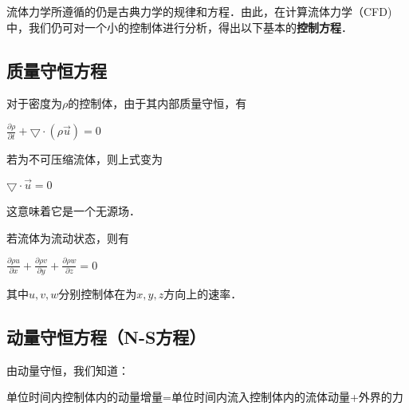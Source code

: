 
\begin{issues}
\issueDraft
\end{issues}


流体力学所遵循的仍是古典力学的规律和方程．由此，在计算流体力学（CFD)中，我们仍可对一个小的控制体进行分析，得出以下基本的\textbf{控制方程}．

\subsection{质量守恒方程}
对于密度为$\rho$的控制体，由于其内部质量守恒，有

$\frac{\partial \rho }{\partial t}+\bigtriangledown \cdot (\rho \overrightarrow{u})=0$

若为不可压缩流体，则上式变为

$\bigtriangledown \cdot \overrightarrow{u} =0$

这意味着它是一个无源场．

若流体为流动状态，则有

$\frac{\partial \rho u}{\partial x}+\frac{\partial \rho v}{\partial y}+\frac{\partial \rho w}{\partial z}=0$

其中$u,v,w$分别控制体在为$x,y,z$方向上的速率．


\subsection{动量守恒方程（N-S方程）}
由动量守恒，我们知道：

单位时间内控制体内的动量增量=单位时间内流入控制体内的流体动量+外界的力
